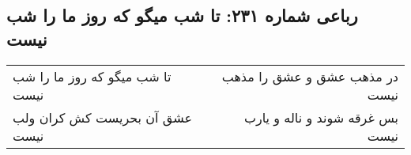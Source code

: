 \begin{center}
\section*{رباعی شماره ۲۳۱: تا شب میگو که روز ما را شب نیست}
\label{sec:0231}
\begin{longtable}{l p{0.5cm} r}
تا شب میگو که روز ما را شب نیست
&&
در مذهب عشق و عشق را مذهب نیست
\\
عشق آن بحریست کش کران ولب نیست
&&
بس غرقه شوند و ناله و یارب نیست
\\
\end{longtable}
\end{center}
